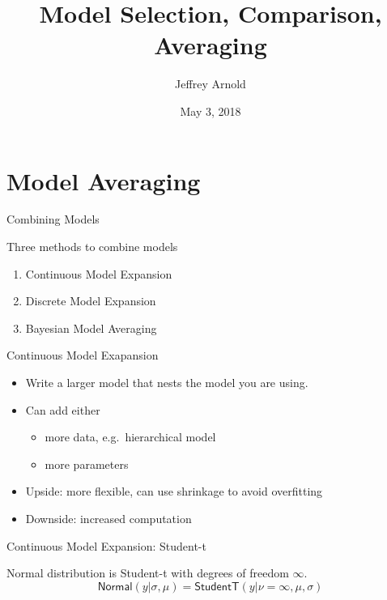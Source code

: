 \documentclass[ignorenonframetext,]{beamer}
\title{Model Selection, Comparison, Averaging}
\author{Jeffrey Arnold}
\date{May 3, 2018}
\providecommand{\tightlist}{%
  \setlength{\itemsep}{0pt}\setlength{\parskip}{0pt}}
\begin{document}
\frame{\titlepage}

\hypertarget{model-averaging}{%
\section{Model Averaging}\label{model-averaging}}

\begin{frame}{Combining Models}
\protect\hypertarget{combining-models}{}

Three methods to combine models

\begin{enumerate}
[1.]
\tightlist
\item
  Continuous Model Expansion
\item
  Discrete Model Expansion
\item
  Bayesian Model Averaging
\end{enumerate}

\end{frame}

\begin{frame}{Continuous Model Exapansion}
\protect\hypertarget{continuous-model-exapansion}{}

\begin{itemize}
\item
  Write a larger model that nests the model you are using.
\item
  Can add either

  \begin{itemize}
  \tightlist
  \item
    more data, e.g.~hierarchical model
  \item
    more parameters
  \end{itemize}
\item
  Upside: more flexible, can use shrinkage to avoid overfitting
\item
  Downside: increased computation
\end{itemize}

\end{frame}

\begin{frame}{Continuous Model Expansion: Student-t}
\protect\hypertarget{continuous-model-expansion-student-t}{}

Normal distribution is Student-t with degrees of freedom \(\infty\). \[
\mathsf{Normal}(y|\sigma, \mu) = \mathsf{StudentT}(y|\nu = \infty, \mu, \sigma)
\]

\end{frame}
\end{document}
